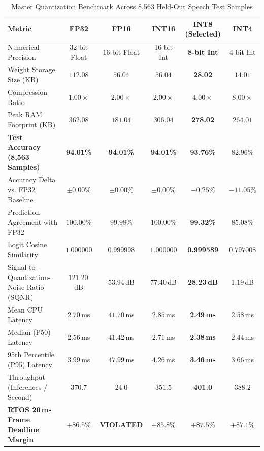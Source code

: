 \documentclass[10pt,twocolumn,letterpaper]{article}
\begin{document}
\begin{table}[t]
\centering
\small
\caption{Master Quantization Benchmark Across 8,563 Held-Out Speech Test Samples}
\label{tab:quantization_benchmark}
\begin{tabular}{lccccc}
\toprule
\textbf{Metric} & \textbf{FP32} & \textbf{FP16} & \textbf{INT16} & \textbf{INT8 (Selected)} & \textbf{INT4} \\
\midrule
Numerical Precision & 32-bit Float & 16-bit Float & 16-bit Int & \textbf{8-bit Int} & 4-bit Int \\
Weight Storage Size (KB) & $112.08$ & $56.04$ & $56.04$ & \textbf{28.02} & $14.01$ \\
Compression Ratio & $1.00\times$ & $2.00\times$ & $2.00\times$ & $\mathbf{4.00\times}$ & $8.00\times$ \\
Peak RAM Footprint (KB) & $362.08$ & $181.04$ & $306.04$ & \textbf{278.02} & $264.01$ \\
\midrule
\textbf{Test Accuracy (8,563 Samples)} & \textbf{94.01\%} & \textbf{94.01\%} & \textbf{94.01\%} & \textbf{93.76\%} & $82.96\%$ \\
Accuracy Delta vs. FP32 Baseline & $\pm 0.00\%$ & $\pm 0.00\%$ & $\pm 0.00\%$ & $\mathbf{-0.25\%}$ & $-11.05\%$ \\
Prediction Agreement with FP32 & $100.00\%$ & $99.98\%$ & $100.00\%$ & \textbf{99.32\%} & $85.08\%$ \\
Logit Cosine Similarity & $1.000000$ & $0.999998$ & $1.000000$ & \textbf{0.999589} & $0.797008$ \\
Signal-to-Quantization-Noise Ratio (SQNR) & $121.20$\,dB & $53.94$\,dB & $77.40$\,dB & \textbf{28.23\,dB} & $1.19$\,dB \\
\midrule
Mean CPU Latency & $2.70$\,ms & $41.70$\,ms & $2.85$\,ms & \textbf{2.49\,ms} & $2.58$\,ms \\
Median (P50) Latency & $2.56$\,ms & $41.42$\,ms & $2.71$\,ms & \textbf{2.38\,ms} & $2.44$\,ms \\
95th Percentile (P95) Latency & $3.99$\,ms & $47.99$\,ms & $4.26$\,ms & \textbf{3.46\,ms} & $3.66$\,ms \\
Throughput (Inferences / Second) & $370.7$ & $24.0$ & $351.5$ & \textbf{401.0} & $388.2$ \\
\midrule
\textbf{RTOS 20\,ms Frame Deadline Margin} & $\mathbf{+86.5\%}$ & \textbf{VIOLATED} & $\mathbf{+85.8\%}$ & $\mathbf{+87.5\%}$ & $+87.1\%$ \\
\bottomrule
\end{tabular}
\end{table}
\end{document}
